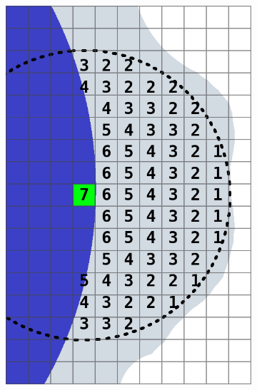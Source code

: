 \documentclass[review]{elsarticle}
\begin{document}
\begin{figure}[t]
  \centering
  \begin{subfigure}[b]{.30\linewidth}
    \centering
    \includegraphics[width=\textwidth]{fig6a.png}
    \label{fig:added}
    \caption{}%
  \end{subfigure}%
  \hspace{1em}
  \begin{subfigure}[b]{.30\linewidth}
    \centering

\end{subfigure}
\end{figure}
\end{document}
